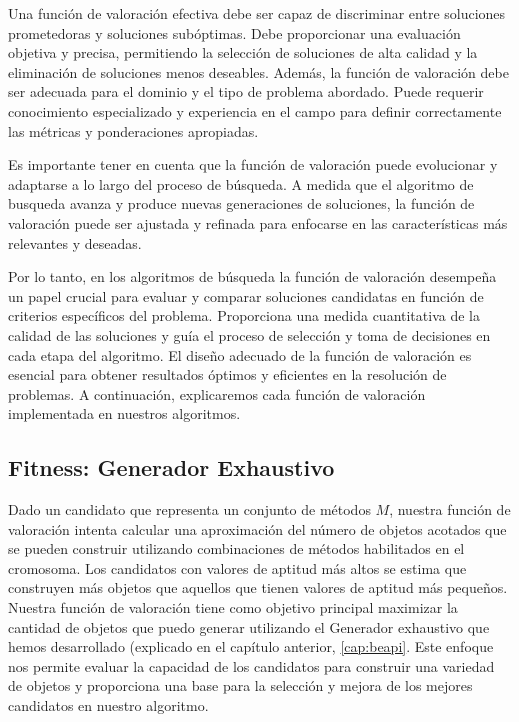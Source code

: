 Una función de valoración efectiva debe ser capaz de discriminar entre soluciones prometedoras y soluciones subóptimas. Debe proporcionar una evaluación objetiva y precisa, permitiendo la selección de soluciones de alta calidad y la eliminación de soluciones menos deseables.
Además, la función de valoración debe ser adecuada para el dominio y el tipo de problema abordado. Puede requerir conocimiento especializado y experiencia en el campo para definir correctamente las métricas y ponderaciones apropiadas. 

Es importante tener en cuenta que la función de valoración puede evolucionar y adaptarse a lo largo del proceso de búsqueda. A medida que el algoritmo de busqueda avanza y produce nuevas generaciones de soluciones, la función de valoración puede ser ajustada y refinada para enfocarse en las características más relevantes y deseadas.


Por lo tanto, en los algoritmos de búsqueda la función de valoración desempeña un papel crucial para evaluar y comparar soluciones candidatas en función de criterios específicos del problema. Proporciona una medida cuantitativa de la calidad de las soluciones y guía el proceso de selección y toma de decisiones en cada etapa del algoritmo. El diseño adecuado de la función de valoración es esencial para obtener resultados óptimos y eficientes en la resolución de problemas.
A continuación, explicaremos cada función de valoración implementada en nuestros algoritmos.






\subsection{Fitness: Generador Exhaustivo}

Dado un candidato que representa un conjunto de métodos $M$, nuestra función de valoración intenta calcular una aproximación del número de objetos acotados que se pueden construir utilizando combinaciones de métodos habilitados en el cromosoma. Los candidatos con valores de aptitud más altos se estima que construyen más objetos que aquellos que tienen valores de aptitud más pequeños.
Nuestra función de valoración tiene como objetivo principal maximizar la cantidad de objetos que puedo generar utilizando el Generador exhaustivo que hemos desarrollado (explicado en el capítulo anterior,  \ref{cap:beapi}. Este enfoque nos permite evaluar la capacidad de los candidatos para construir una variedad de objetos y proporciona una base para la selección y mejora de los mejores candidatos en nuestro algoritmo.

